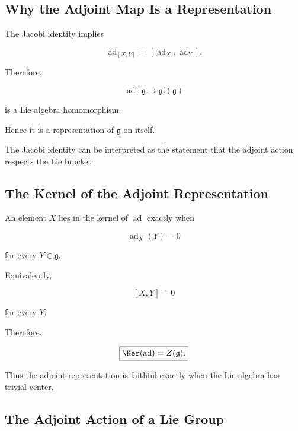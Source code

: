 \subsection{Why the Adjoint Map Is a Representation}
\label{subsec:adjoint-is-representation}

The Jacobi identity implies

\[ \operatorname{ad}_{[X,Y]}
=[\operatorname{ad}_X,\operatorname{ad}_Y]. \]

Therefore,

\[ \operatorname{ad}:\mathfrak g\to\mathfrak{gl}(\mathfrak g) \]

is a Lie algebra homomorphism.

Hence it is a representation of \(\mathfrak g\) on itself.

\begin{conceptbox}
The Jacobi identity can be interpreted as the statement that the adjoint
action respects the Lie bracket.
\end{conceptbox}

\subsection{The Kernel of the Adjoint Representation}
\label{subsec:kernel-adjoint}

An element \(X\) lies in the kernel of \(\operatorname{ad}\) exactly when

\[ \operatorname{ad}_X(Y)=0 \]

for every \(Y\in\mathfrak g\).

Equivalently,

\[ [X,Y]=0 \]

for every \(Y\).

Therefore,

\[ \boxed{\Ker(\operatorname{ad})=Z(\mathfrak g).} \]

Thus the adjoint representation is faithful exactly when the Lie algebra has
trivial center.

\subsection{The Adjoint Action of a Lie Group}
\label{subsec:lie-group-adjoint-action}

